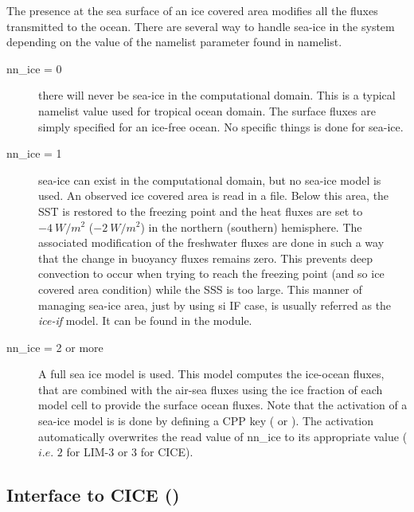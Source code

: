 \documentclass[../tex_main/NEMO_manual]{subfiles}
\begin{document}
The presence at the sea surface of an ice covered area modifies all the fluxes 
transmitted to the ocean. There are several way to handle sea-ice in the system 
depending on the value of the  namelist parameter found in  namelist.  
\begin{description}
\item[nn{\_}ice = 0]  there will never be sea-ice in the computational domain. 
This is a typical namelist value used for tropical ocean domain. The surface fluxes 
are simply specified for an ice-free ocean. No specific things is done for sea-ice.
\item[nn{\_}ice = 1]  sea-ice can exist in the computational domain, but no sea-ice model 
is used. An observed ice covered area is read in a file. Below this area, the SST is 
restored to the freezing point and the heat fluxes are set to $-4~W/m^2$ ($-2~W/m^2$) 
in the northern (southern) hemisphere. The associated modification of the freshwater 
fluxes are done in such a way that the change in buoyancy fluxes remains zero. 
This prevents deep convection to occur when trying to reach the freezing point 
(and so ice covered area condition) while the SSS is too large. This manner of 
managing sea-ice area, just by using si IF case, is usually referred as the \textit{ice-if} 
model. It can be found in the  module.
\item[nn{\_}ice = 2 or more]  A full sea ice model is used. This model computes the 
ice-ocean fluxes, that are combined with the air-sea fluxes using the ice fraction of 
each model cell to provide the surface ocean fluxes. Note that the activation of a 
sea-ice model is is done by defining a CPP key ( or ). 
The activation automatically overwrites the read value of nn{\_}ice to its appropriate 
value ($i.e.$ $2$ for LIM-3 or $3$ for CICE).
\end{description}


\subsection{Interface to CICE (\protect{})}
\label{subsec:SBC_cice}
\end{document}

